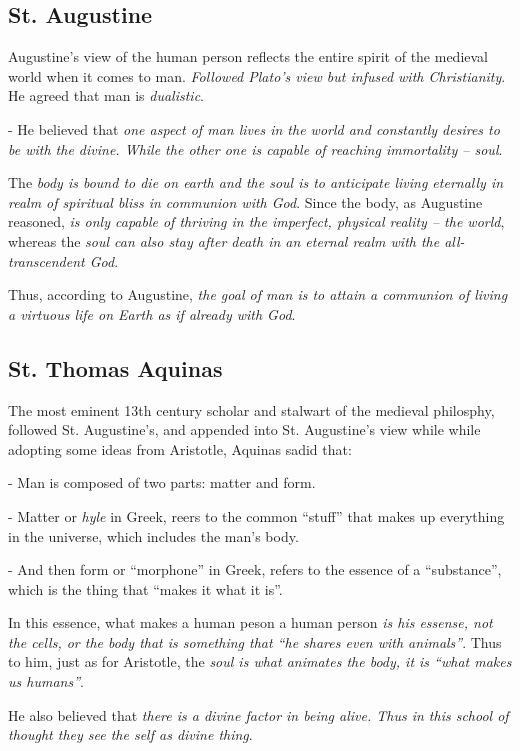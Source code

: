 \documentclass[12pt, UTF8]{article}
\begin{document}
	\subsection*{St. Augustine}
	
	Augustine's view of the human person reflects the entire spirit of the medieval world when it comes to man. \emph{Followed Plato's view but infused with Christianity}. He agreed that man is \textit{dualistic}.
	
	- He believed that \emph{one aspect of man lives in the world and constantly desires to be with the divine. While the other one is capable of reaching immortality -- soul}.
	
	The \textit{body is bound to die on earth and the soul is to anticipate living eternally in realm of spiritual bliss in communion with God}. Since the body, as Augustine reasoned, \emph{is only capable of thriving in the imperfect, physical reality -- the world}, whereas the \textit{soul can also stay after death in an eternal realm with the all-transcendent God}.
	
	Thus, according to Augustine, \emph{the goal of man is to attain a communion of living a virtuous life on Earth as if already with God}.
	
	\subsection*{St. Thomas Aquinas}
	
	The most eminent 13th century scholar and stalwart of the medieval philosphy, followed St. Augustine's, and appended into St. Augustine's view while while adopting some ideas from Aristotle, Aquinas sadid that:
	
	- Man is composed of two parts: matter and form.
	
	- Matter or \textit{hyle} in Greek, reers to the common ``stuff'' that makes up everything in the universe, which includes the man's body.
	
	- And then form or ``morphone'' in Greek, refers to the essence of a ``substance'', which is the thing that ``makes it what it is''.
	
	In this essence, what makes a human peson a human person \emph{is his essense, not the cells, or the body that is something that ``he shares even with animals''}. Thus to him, just as for Aristotle, the \emph{soul is what animates the body, it is ``what makes us humans''}.
	
	He also believed that \emph{there is a divine factor in being alive. Thus in this school of thought they see the self as divine thing}.
	
\end{document}
